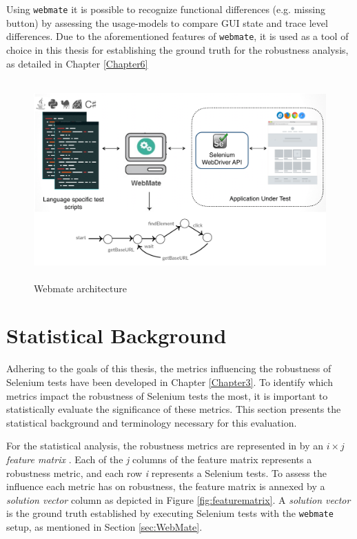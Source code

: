 Using \texttt{webmate} it is possible to recognize functional differences (e.g. missing button) by assessing the usage-models to compare GUI state and trace level differences. Due to the aforementioned features of \texttt{webmate}, it is used as a tool of choice in this thesis for establishing the ground truth for the robustness analysis, as detailed in Chapter \ref{Chapter6}

\begin{figure}
\makeatletter 
\makeatother
    \centering
  \includegraphics[width=5.5in,height=3in]{./Figures/webmate-state-graph}
  \caption{Webmate architecture}
  \label{fig:webmateArchitecture} 
\end{figure}



\section{Statistical Background}
\label{sec:Statistical}
Adhering to the goals of this thesis, the metrics influencing the robustness of Selenium tests have been developed in Chapter \ref{Chapter3}. To identify which metrics impact the robustness of Selenium tests the most, it is important to statistically evaluate the significance of these metrics. This section presents the statistical background and terminology necessary for this evaluation.

For the statistical analysis, the robustness metrics are represented in by an $i\times j$  \textit{feature matrix} \cite{li2005lasso}. Each of the \textit{j} columns of the feature matrix represents a robustness metric, and each row
\textit{i} represents a Selenium tests. To assess the influence each metric has on robustness, the feature matrix is annexed by a \textit{solution vector} column as depicted in Figure \ref{fig:featurematrix}. A \textit{solution vector} is the ground truth established by executing Selenium tests with the \texttt{webmate} setup, as mentioned in Section \ref{sec:WebMate}.

